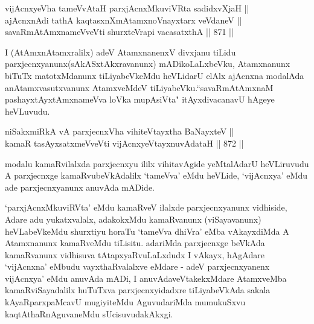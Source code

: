 
\begin{shl}
vijAcnxyeVha tameVvAtaH parxjAcnxMkuviVRta sadidxvXjaH || \\
ajAcnxnAdi tathA kaqtasxnXmAtamxnoV\s nayxtarx veVdaneV || \\
savaRmAtAmxnameVveVti shurxteVrapi vacasatxthA \hfill || 871 ||  
\end{shl}

\begin{artha}
I (AtAmxnAtamxralilx) adeV AtamxnanenxV divxjanu tiLidu parxjecnxyanunx(sAkASxtAkxravanunx) mADikoLaLxbeVku, Atamxnanunx biTuTx matotxMdanunx tiLiyabeVkeMdu heVLidarU elAlx ajAcnxna modalAda anAtamxvasutxvanunx AtamxveMdeV tiLiyabeVku.``savaRmAtAmxnaM pashayxtAyxtAmxnameVva loVka mupAsiVta" itAyxdivacanavU hAgeye heVLuvudu.
\end{artha}


\begin{shl}
niSakxmiRkA vA parxjecnxVha vihiteVtayxtha BaNayxteV || \\
kamaR tasAyxsatxmeVveVti vijAcnxyeVtayxnuvAdataH \hfill || 872 ||  
\end{shl}

\begin{artha}
modalu kamaRvilalxda parxjecnxyu ililx vihitavAgide yeMtalAdarU heVLiruvudu A parxjecnxge kamaRvubeVkAdalilx `tameVva' eMdu heVLide, `vijAcnxya' eMdu ade parxjecnxyanunx anuvAda mADide.
\end{artha}


\begin{artha}
`parxjAcnxMkuviRVta' eMdu kamaRveV ilalxde parxjecnxyanunx vidhiside, Adare adu yukatxvalalx, adakokxMdu kamaRvanunx (viSayavanunx) heVLabeVkeMdu shurxtiyu horaTu `tameVva dhiVra' eMba vAkayxdiMda A Atamxnanunx kamaRveMdu tiLisitu. adariMda parxjecnxge beVkAda kamaRvanunx vidhisuva tAtapxyaRvuLaLxdudx I vAkayx, hAgAdare `vijAcnxna' eMbudu vayxthaRvalalxve eMdare - adeV parxjecnxyanenx vijAcnxya' eMdu anuvAda mADi, I anuvAdaveVtakekxMdare AtamxveMba kamaRviSayadalilx huTuTxva parxjecnxyidadxre tiLiyabeVkAda sakala kAyaRparxpaMcavU mugiyiteMdu AguvudariMda mumukuSxvu kaqtAthaRnAguvaneMdu sUcisuvudakAkxgi.
\end{artha}


